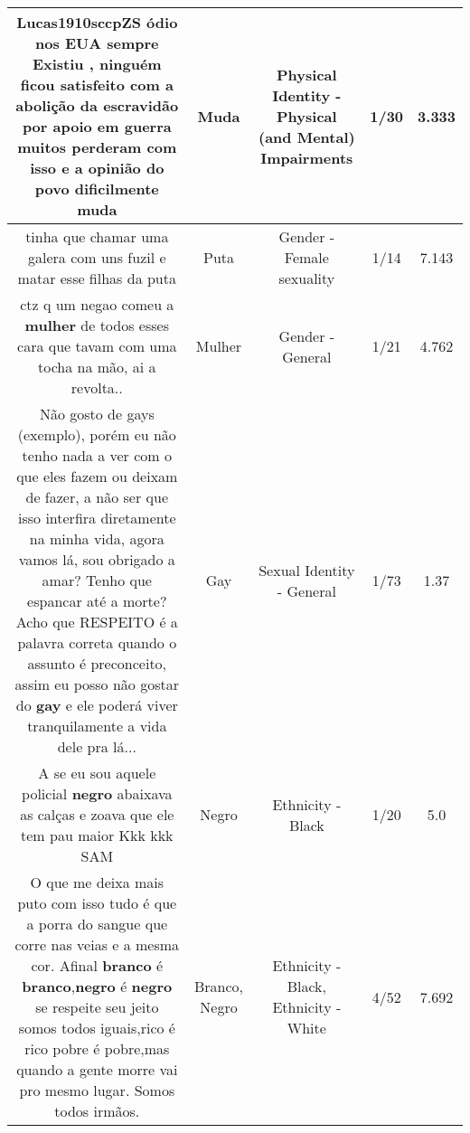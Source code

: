 \documentclass[11pt]{article}
\newlength\mylength
\begin{document}
\begin{center}
\begin{longtable}{|C{.65\mylength}|C{.30\mylength}|C{.12\mylength}|C{.12\mylength}|C{.12\mylength}|}
  \small Lucas1910sccpZS ódio nos EUA sempre Existiu , ninguém ficou satisfeito com a abolição da escravidão por apoio em guerra muitos perderam com isso e a opinião do povo dificilmente muda\normalsize   & Muda & Physical Identity - Physical (and Mental) Impairments & 1/30 & 3.333 \\  \hline
  \small tinha que chamar uma galera com uns fuzil e matar esse filhas da puta\normalsize   & Puta & Gender - Female sexuality & 1/14 & 7.143 \\  \hline
  \small ctz q um negao comeu a \textbf{mulher} de todos esses cara que tavam com uma tocha na mão, ai a revolta..\normalsize   & Mulher & Gender - General & 1/21 & 4.762 \\  \hline
  \small Não gosto de gays (exemplo), porém eu não tenho nada a ver com o que eles fazem ou deixam de fazer, a não ser que isso interfira diretamente na minha vida, agora vamos lá, sou obrigado a amar? Tenho que espancar até a morte? Acho que RESPEITO é a palavra correta quando o assunto é preconceito, assim eu posso não gostar do \textbf{gay} e ele poderá viver tranquilamente a vida dele pra lá...\normalsize   & Gay & Sexual Identity - General & 1/73 & 1.37 \\  \hline
  \small A se eu sou aquele policial \textbf{negro} abaixava as calças e zoava que ele tem pau maior Kkk kkk SAM\normalsize   & Negro & Ethnicity - Black & 1/20 & 5.0 \\  \hline
  \small O que me deixa mais puto com isso tudo é que a porra do sangue que corre nas veias e a mesma cor. Afinal \textbf{branco} é \textbf{branco},\textbf{negro} é \textbf{negro} se respeite seu jeito somos todos iguais,rico é rico pobre é pobre,mas quando a gente morre vai pro mesmo lugar. Somos todos irmãos.\normalsize   & Branco, Negro & Ethnicity - Black, Ethnicity - White & 4/52 & 7.692 \\  \hline

\end{longtable}
\end{center}
\end{document}
